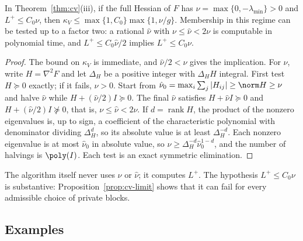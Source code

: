\begin{corollary}\label{cor:cv-nu}
In Theorem~\ref{thm:cv}(iii), if the full Hessian of $F$ has
$\nu=\max\{0,-\lambda_{\min}\}>0$ and $L^+\le C_0\nu$, then
$\kappa_V\le\max\{1,C_0\}\max\{1,\nu/g\}$. Membership in this regime can be
tested up to a factor two: a rational $\hat\nu$ with $\nu\le\hat\nu<2\nu$ is
computable in polynomial time, and $L^+\le C_0\hat\nu/2$ implies
$L^+\le C_0\nu$.
\end{corollary}

\begin{proof}
The bound on $\kappa_V$ is immediate, and $\hat\nu/2<\nu$ gives the
implication. For $\hat\nu$, write $H=\nabla^2F$ and let $\Delta_H$ be a
positive integer with $\Delta_HH$ integral. First test $H\succeq0$ exactly;
if it fails, $\nu>0$. Start from $\hat\nu_0=\max_i\sum_j|H_{ij}|\ge\norm
H\ge\nu$ and halve $\hat\nu$ while $H+(\hat\nu/2)I\succeq0$. The final
$\hat\nu$ satisfies $H+\hat\nu I\succeq0$ and $H+(\hat\nu/2)I\not\succeq0$,
that is, $\nu\le\hat\nu<2\nu$. If $d=\operatorname{rank}H$, the product of
the nonzero eigenvalues is, up to sign, a coefficient of the characteristic
polynomial with denominator dividing $\Delta_H^d$, so its absolute value is
at least $\Delta_H^{-d}$. Each nonzero eigenvalue is at most $\hat\nu_0$ in
absolute value, so $\nu\ge\Delta_H^{-d}\hat\nu_0^{1-d}$, and the number of
halvings is $\poly(I)$. Each test is an exact symmetric elimination.
\end{proof}

The algorithm itself never uses $\nu$ or $\hat\nu$; it computes $L^+$. The
hypothesis $L^+\le C_0\nu$ is substantive: Proposition~\ref{prop:cv-limit}
shows that it can fail for every admissible choice of private blocks.

\subsection{Examples}

